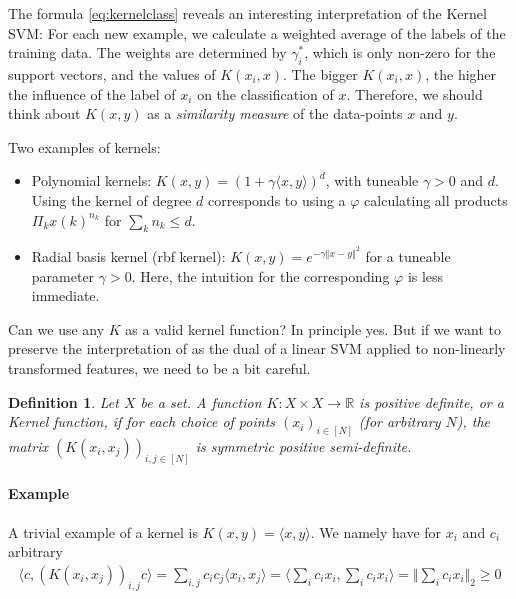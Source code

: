 \documentclass{article}
\newcommand{\sprod}[1]{\langle #1 \rangle}
\newcommand{\R}{\mathbb{R}}
\newtheorem{defi}{Definition}
\newcommand{\norm}[1]{\Vert #1 \Vert}
\begin{document}
The formula \eqref{eq:kernelclass} reveals an interesting interpretation of the Kernel SVM: For each new example, we calculate a weighted average of the labels of the training data. The weights are determined by $\gamma_i^*$, which is only non-zero for the support vectors, and the values of $K(x_i,x)$. The bigger $K(x_i,x)$, the higher the influence of the label of $x_i$ on the classification of $x$. Therefore, we should think about $K(x,y)$ as a \emph{similarity measure} of the data-points $x$ and $y$.

Two examples of kernels:
\begin{itemize}
    \item Polynomial kernels: $K(x,y) = (1+\gamma\sprod{x,y})^d$, with tuneable $\gamma>0$ and $d$. Using the kernel of degree $d$ corresponds to using a $\varphi$ calculating all products $\Pi_k x(k)^{n_k}$ for $\sum_{k}n_k \leq d$.
    \item Radial basis kernel (rbf kernel):  $K(x,y) = e^{-\gamma\norm{x-y}^2}$ for a tuneable parameter $\gamma>0$. Here, the intuition for the corresponding $\varphi$ is less immediate.
\end{itemize}

Can we use any $K$ as a valid kernel function? In principle yes. But if we want to preserve the interpretation of \label{eq:kernelsvm} as the dual of a linear SVM applied to non-linearly transformed features, we need to be a bit careful.

\begin{defi}
    Let $X$ be a set. A function $K:X \times X\to \R$ is  \emph{positive definite}, or a \emph{Kernel function}, if for each choice of points $(x_i)_{i\in [N]}$ (for arbitrary $N$), the matrix $(K(x_i,x_j))_{i,j\in [N]}$ is symmetric positive semi-definite.
\end{defi}

\paragraph{Example} A trivial example of a kernel is $K(x,y)=\sprod{x,y}$. We namely have for $x_i$ and $c_i$ arbitrary
\begin{align*}
    \sprod{c, (K(x_i,x_j))_{i,j} c} = \sum_{i,j} c_ic_j \sprod{x_i,x_j} = \sprod{\sum_i c_i x_i, \sum_i c_i x_i} = \norm{ \sum_i c_i x_i}_2 \geq 0
\end{align*}
\end{document}
